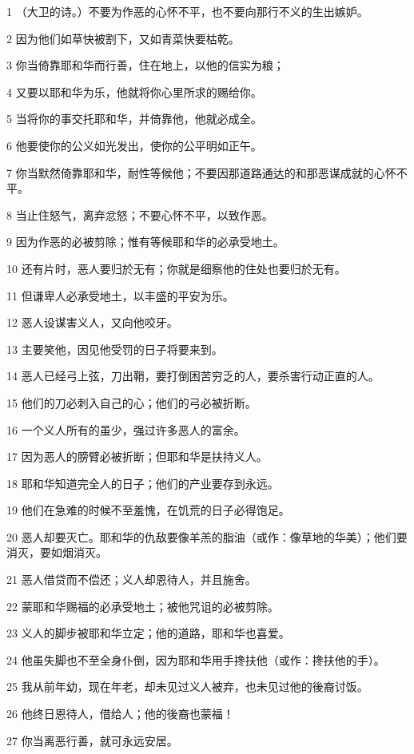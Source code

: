 \par 1 （大卫的诗。）不要为作恶的心怀不平，也不要向那行不义的生出嫉妒。
\par 2 因为他们如草快被割下，又如青菜快要枯乾。
\par 3 你当倚靠耶和华而行善，住在地上，以他的信实为粮；
\par 4 又要以耶和华为乐，他就将你心里所求的赐给你。
\par 5 当将你的事交托耶和华，并倚靠他，他就必成全。
\par 6 他要使你的公义如光发出，使你的公平明如正午。
\par 7 你当默然倚靠耶和华，耐性等候他；不要因那道路通达的和那恶谋成就的心怀不平。
\par 8 当止住怒气，离弃忿怒；不要心怀不平，以致作恶。
\par 9 因为作恶的必被剪除；惟有等候耶和华的必承受地土。
\par 10 还有片时，恶人要归於无有；你就是细察他的住处也要归於无有。
\par 11 但谦卑人必承受地土，以丰盛的平安为乐。
\par 12 恶人设谋害义人，又向他咬牙。
\par 13 主要笑他，因见他受罚的日子将要来到。
\par 14 恶人已经弓上弦，刀出鞘，要打倒困苦穷乏的人，要杀害行动正直的人。
\par 15 他们的刀必刺入自己的心；他们的弓必被折断。
\par 16 一个义人所有的虽少，强过许多恶人的富余。
\par 17 因为恶人的膀臂必被折断；但耶和华是扶持义人。
\par 18 耶和华知道完全人的日子；他们的产业要存到永远。
\par 19 他们在急难的时候不至羞愧，在饥荒的日子必得饱足。
\par 20 恶人却要灭亡。耶和华的仇敌要像羊羔的脂油（或作：像草地的华美）；他们要消灭，要如烟消灭。
\par 21 恶人借贷而不偿还；义人却恩待人，并且施舍。
\par 22 蒙耶和华赐福的必承受地土；被他咒诅的必被剪除。
\par 23 义人的脚步被耶和华立定；他的道路，耶和华也喜爱。
\par 24 他虽失脚也不至全身仆倒，因为耶和华用手搀扶他（或作：搀扶他的手）。
\par 25 我从前年幼，现在年老，却未见过义人被弃，也未见过他的後裔讨饭。
\par 26 他终日恩待人，借给人；他的後裔也蒙福！
\par 27 你当离恶行善，就可永远安居。
